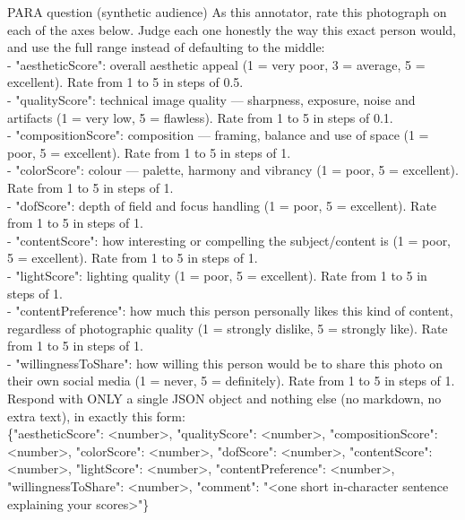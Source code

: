 \documentclass[runningheads]{llncs}
\begin{document}
\begin{promptbox}{PARA question (synthetic audience)}
\ttfamily
As this annotator, rate this photograph on each of the axes below. Judge each one honestly the way this exact person would, and use the full range instead of defaulting to the middle:\\
- "aestheticScore": overall aesthetic appeal (1 = very poor, 3 = average, 5 = excellent). Rate from 1 to 5 in steps of 0.5.\\
- "qualityScore": technical image quality — sharpness, exposure, noise and artifacts (1 = very low, 5 = flawless). Rate from 1 to 5 in steps of 0.1.\\
- "compositionScore": composition — framing, balance and use of space (1 = poor, 5 = excellent). Rate from 1 to 5 in steps of 1.\\
- "colorScore": colour — palette, harmony and vibrancy (1 = poor, 5 = excellent). Rate from 1 to 5 in steps of 1.\\
- "dofScore": depth of field and focus handling (1 = poor, 5 = excellent). Rate from 1 to 5 in steps of 1.\\
- "contentScore": how interesting or compelling the subject/content is (1 = poor, 5 = excellent). Rate from 1 to 5 in steps of 1.\\
- "lightScore": lighting quality (1 = poor, 5 = excellent). Rate from 1 to 5 in steps of 1.\\
- "contentPreference": how much this person personally likes this kind of content, regardless of photographic quality (1 = strongly dislike, 5 = strongly like). Rate from 1 to 5 in steps of 1.\\
- "willingnessToShare": how willing this person would be to share this photo on their own social media (1 = never, 5 = definitely). Rate from 1 to 5 in steps of 1.\\[2pt]
Respond with ONLY a single JSON object and nothing else (no markdown, no extra text), in exactly this form:\\
\{"aestheticScore": <number>, "qualityScore": <number>, "compositionScore": <number>, "colorScore": <number>, "dofScore": <number>, "contentScore": <number>, "lightScore": <number>, "contentPreference": <number>, "willingnessToShare": <number>, "comment": "<one short in-character sentence explaining your scores>"\}
\end{promptbox}
\end{document}
